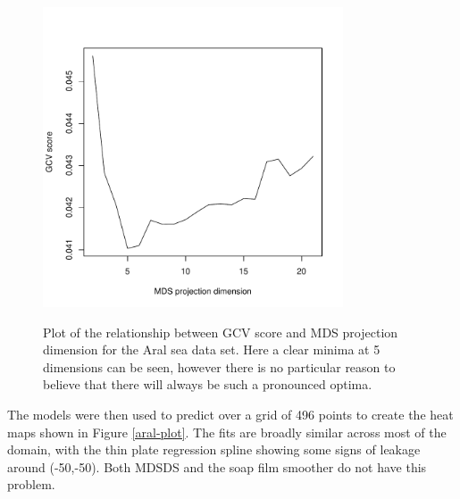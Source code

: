 \documentclass[useAMS, referee]{biom}
\begin{document}
\begin{figure}
\centering
\includegraphics[width=3.5in]{examples/aral/aral-gcvplot.pdf} \\
\caption{Plot of the relationship between GCV score and MDS projection dimension for the Aral sea data set. Here a clear minima at 5 dimensions can be seen, however there is no particular reason to believe that there will always be such a pronounced optima.}
\label{aral-gcvplot}
\end{figure}

The models were then used to predict over a grid of 496 points to create the heat maps shown in Figure \ref{aral-plot}. The fits are broadly similar across most of the domain, with the thin plate regression spline showing some signs of leakage around (-50,-50). Both MDSDS and the soap film smoother do not have this problem. 
\end{document}
